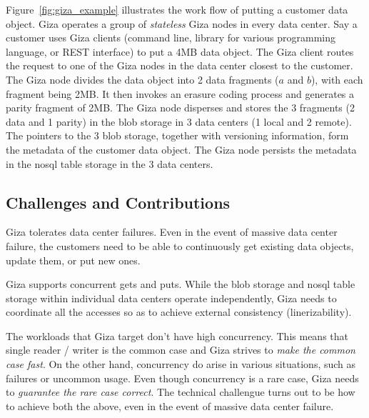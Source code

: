 Figure~\ref{fig:giza_example} illustrates the work flow of putting a customer data object. Giza operates a group of {\em stateless} Giza nodes in every data center. Say a customer uses Giza clients (command line, library for various programming language, or REST interface) to put a 4MB data object. The Giza client routes the request to one of the Giza nodes in the data center closest to the customer. The Giza node divides the data object into 2 data fragments ($a$ and $b$), with each fragment being 2MB. It then invokes an erasure coding process and generates a parity fragment of 2MB. The Giza node disperses and stores the 3 fragments (2 data and 1 parity) in the blob storage in 3 data centers (1 local and 2 remote). The pointers to the 3 blob storage, together with versioning information, form the metadata of the customer data object. The Giza node persists the metadata in the nosql table storage in the 3 data centers.

\subsection{Challenges and Contributions}

Giza tolerates data center failures. Even in the event of massive data center failure, the customers need to be able to continuously get existing data objects, update them, or put new ones.

Giza supports concurrent gets and puts. While the blob storage and nosql table storage within individual data centers operate independently, Giza needs to coordinate all the accesses so as to achieve external consistency (linerizability).

The workloads that Giza target don't have high concurrency. This means that single reader / writer is the common case and Giza strives to {\em make the common case fast}. On the other hand, concurrency do arise in various situations, such as failures or uncommon usage. Even though concurrency is a rare case, Giza needs to {\em guarantee the rare case correct}. The technical challengue turns out to be how to achieve both the above, even in the event of massive data center failure.

